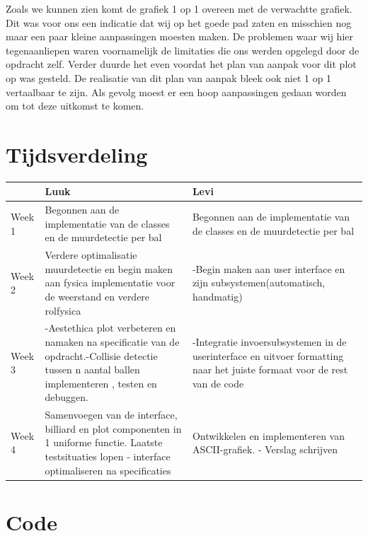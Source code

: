 \documentclass{article}
\begin{document}
Zoals we kunnen zien komt de grafiek 1 op 1 overeen met de verwachtte grafiek. Dit was voor ons een indicatie dat wij op het goede pad zaten en misschien nog maar een paar kleine aanpassingen moesten maken. De problemen waar wij hier tegenaanliepen waren voornamelijk de limitaties die ons werden opgelegd door de opdracht zelf. Verder duurde het even voordat het plan van aanpak voor dit plot op was gesteld. De realisatie van dit plan van aanpak bleek ook niet 1 op 1 vertaalbaar te zijn. Als gevolg moest er een hoop aanpassingen gedaan worden om tot deze uitkomst te komen.  

\section{Tijdsverdeling}

\begin{tabular}{ l | p{6cm} p{6cm} }
   & Luuk & Levi \\
  \hline
  Week 1 & Begonnen aan de implementatie van de classes en de muurdetectie per bal &  Begonnen aan de implementatie van de classes en de muurdetectie per bal \\
  Week 2 & Verdere optimalisatie muurdetectie en begin maken aan fysica implementatie voor de weerstand en verdere rolfysica & -Begin maken aan user interface en zijn subsystemen(automatisch, handmatig) \\
  Week 3 & -Aestethica plot verbeteren en namaken na specificatie van de opdracht.\linebreak -Collisie detectie tussen n aantal ballen implementeren , testen en debuggen. & -Integratie invoersubsystemen in de userinterface en uitvoer formatting naar het juiste formaat voor de rest van de code  \\
  Week 4  & Samenvoegen van de interface, billiard en plot componenten in 1 uniforme functie. \linebreak Laatste testsituaties lopen \linebreak - interface optimaliseren na specificaties & Ontwikkelen en implementeren van ASCII-grafiek. \linebreak - Verslag schrijven   \\
 
 
 
  
\end{tabular}

\section{Code}

 \begin{lstlisting}[frame=single, language=python]
 
 
 
 \end{lstlisting}
\end{document}
